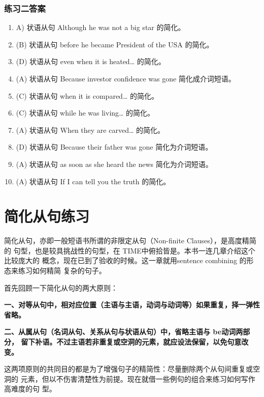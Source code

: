 \subsection{练习二答案}
\begin{enumerate}
\item A) 状语从句 Although he was not a big star 的简化。

\item(B) 状语从句 before he became President of the USA 的简化。

\item(D) 状语从句 even when it is heated… 的简化。

\item (A) 状语从句 Because investor confidence was gone 简化成介词短语。

\item (C) 状语从句 when it is compared… 的简化。

\item (C) 状语从句 while he was living… 的简化。

\item (A) 状语从句 When they are carved… 的简化。

\item (D) 状语从句 Because their father was gone 简化为介词短语。
\item (A) 状语从句 as soon as she heard the news 简化为介词短语。
\item (A) 状语从句 If I can tell you the truth 的简化。
\end{enumerate}

\chapter{简化从句练习}

简化从句，亦即一般短语书所谓的非限定从句（Non-finite Clauses），是高度精简的
句型，也是较具挑战性的句型，在 TIME中俯拾皆是。本书一连几章介绍这个比较庞大的
概念，现在已到了验收的时候。这一章就用sentence combining 的形态来练习如何精简
复杂的句子。

首先回顾一下简化从句的两大原则：

\textbf{一、对等从句中，相对应位置（主语与主语，动词与动词等）如果重复，择一弹性省略。}

\textbf{二、从属从句（名词从句、关系从句与状语从句）中，省略主语与 be动词两部分，
  留下补语。不过主语若非重复或空洞的元素，就应设法保留，以免句意改变。}

这两项原则的共同目的都是为了增强句子的精简性：尽量删除两个从句间重复或空洞的
元素，但以不伤害清楚性为前提。现在就借一些例句的组合来练习如何写作高难度的句
型。

